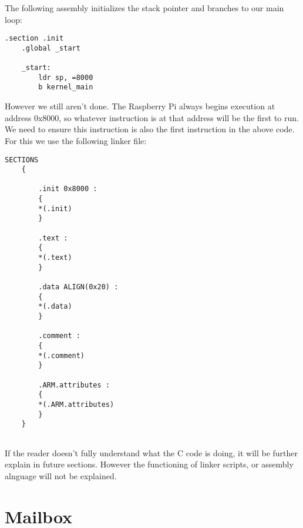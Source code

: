 \documentclass[12pt]{book}
\begin{document}
The following assembly initializes the stack pointer and branches to our main loop:
\lstset{language=ASM}
\begin{lstlisting}[style = ASM]
	.section .init
	.global _start
	
	_start:
		ldr sp, =8000
		b kernel_main
\end{lstlisting}

However we still aren't done. The Raspberry Pi always begins execution at address 0x8000, so whatever instruction is at that address will be the first to run. We need to ensure this instruction is also the first instruction in the above code. For this we use the following linker file:

\newpage
\lstset{language=Linker}
\begin{lstlisting}[style = C]
	SECTIONS 
	{
	
		.init 0x8000 : 
		{
		*(.init)
		}
		
		.text : 
		{
		*(.text)
		}
		
		.data ALIGN(0x20) : 
		{
		*(.data)
		}
		
		.comment :
		{
		*(.comment)
		}
		
		.ARM.attributes :
		{
		*(.ARM.attributes)
		}
	}
	
\end{lstlisting}

If the reader doesn't fully understand what the C code is doing, it will be further explain in future sections. However the functioning of linker scripts, or assembly alnguage will not be explained.
	
\section{Mailbox}
\label{sec:mailbox}
\end{document}

